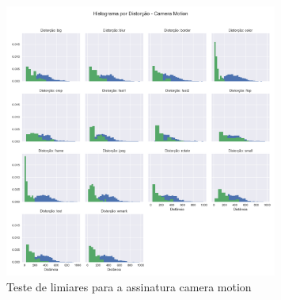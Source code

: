\begin{figure}[h]
	\centering
	\label{fig:limiares-camera-motion}
	\caption{Teste de limiares para a assinatura camera motion}
	\includegraphics[width=0.8\textwidth]{dados/figuras/experimentos/histograma_distorcao_Camera_Motion.png}
\end{figure}

